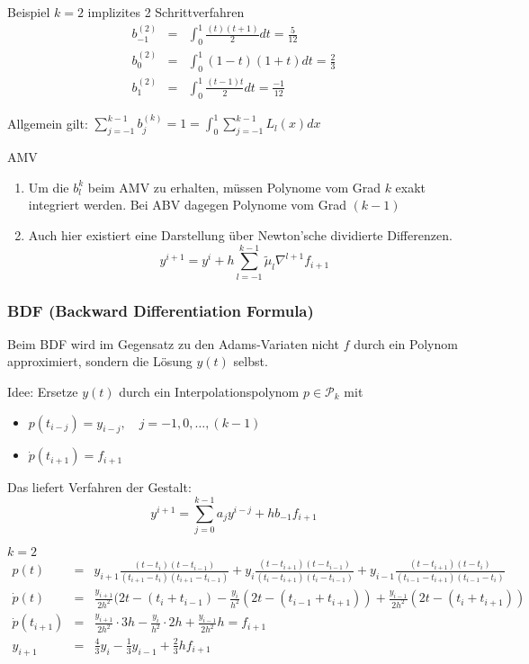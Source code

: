 \begin{example}
	Beispiel $k=2$ implizites 2 Schrittverfahren
	\begin{eqnarray*}
		b_{-1}^{(2)}&=&\int_{0}^{1}\frac{(t)(t+1)}{2}dt=\frac{5}{12}\\
		b_{0}^{(2)}&=&\int_{0}^{1}(1-t)(1+t)dt=\frac{2}{3}\\
		b_{1}^{(2)}&=&\int_{0}^{1}\frac{(t-1)t}{2}dt=\frac{-1}{12}
	\end{eqnarray*}
\end{example}

Allgemein gilt: $\sum_{j=-1}^{k-1}b_{j}^{(k)}=1=\int_{0}^{1}\sum_{j=-1}^{k-1}L_{l}(x)dx$

\begin{remark} AMV
	\begin{enumerate}
		\item Um die $b_{l}^{k}$ beim AMV zu erhalten, müssen Polynome vom Grad $k$ exakt integriert werden. Bei ABV dagegen Polynome
		vom Grad $(k-1)$
		\item Auch hier existiert eine Darstellung über Newton'sche dividierte Differenzen.
		$$y^{i+1}=y^{i}+h\sum_{l=-1}^{k-1}\tilde\mu_{l}\nabla^{l+1}f_{i+1}$$
	\end{enumerate}
\end{remark}

\subsubsection{BDF (Backward Differentiation Formula)}
Beim BDF wird im Gegensatz zu den Adams-Variaten nicht $f$ durch ein Polynom approximiert, sondern die Lösung $y(t)$ selbst.

Idee: Ersetze $y(t)$ durch ein Interpolationspolynom $p\in \mathcal{P}_{k}$ mit
\begin{itemize}
	\item $p(t_{i-j})=y_{i-j},\quad j=-1,0,\ldots,(k-1)$
	\item $\dot p(t_{i+1}) =f_{i+1}$
\end{itemize}

Das liefert Verfahren der Gestalt:
$$y^{i+1}=\sum_{j=0}^{k-1}a_{j}y^{i-j}+hb_{-1}f_{i+1}$$

\begin{example}
$k=2$
\begin{eqnarray*}
	p(t)&=&y_{i+1}\frac{(t-t_{i})(t-t_{i-1})}{(t_{i+1}-t_{i})(t_{i+1}-t_{i-1})} + y_{i}\frac{(t-t_{i+1})(t-t_{i-1})}{(t_{i}-t_{i+1})(t_{i}-t_{i-1})}
	+y_{i-1}\frac{(t-t_{i+1})(t-t_{i})}{(t_{i-1}-t_{i+1})(t_{i-1}-t_{i})}\\
	\dot p(t)&=&\frac{y_{i+1}}{2h^{2}}(2t-(t_{i}+t_{i-1})-\frac{y_{i}}{h^{2}}(2t-(t_{i-1}+t_{i+1}))+\frac{y_{i-1}}{2h^{2}}(2t-(t_{i}+t_{i+1}))\\
	\dot p(t_{i+1})&=&\frac{y_{i+1}}{2h^{2}}\cdot 3h - \frac{y_{i}}{h^{2}}\cdot 2 h+\frac{y_{i-1}}{2h^{2}}h=f_{i+1}\\
	y_{i+1}&=&\frac{4}{3}y_{i}-\frac{1}{3}y_{i-1}+\frac{2}{3}hf_{i+1}	
\end{eqnarray*}
\end{example}

